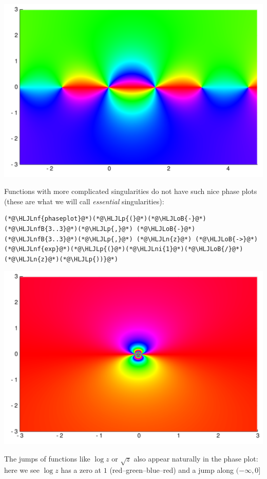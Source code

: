 \documentclass[12pt,a4paper]{article}
\newcommand{\HLJLn}[1]{#1}
\newcommand{\HLJLnf}[1]{\textcolor[RGB]{66,102,213}{#1}}
\newcommand{\HLJLnfB}[1]{\textcolor[RGB]{59,151,46}{#1}}
\newcommand{\HLJLni}[1]{\textcolor[RGB]{59,151,46}{#1}}
\newcommand{\HLJLoB}[1]{\textcolor[RGB]{102,102,102}{\textbf{#1}}}
\newcommand{\HLJLp}[1]{#1}
\def\endash{–}
\begin{document}
\includegraphics[width=\linewidth]{figures/Lecture1_10_1.pdf}

Functions with more complicated singularities do not have such nice phase plots (these are what we will call \emph{essential} singularities):


\begin{lstlisting}
(*@\HLJLnf{phaseplot}@*)(*@\HLJLp{(}@*)(*@\HLJLoB{-}@*)(*@\HLJLnfB{3..3}@*)(*@\HLJLp{,}@*) (*@\HLJLoB{-}@*)(*@\HLJLnfB{3..3}@*)(*@\HLJLp{,}@*) (*@\HLJLn{z}@*) (*@\HLJLoB{->}@*) (*@\HLJLnf{exp}@*)(*@\HLJLp{(}@*)(*@\HLJLni{1}@*)(*@\HLJLoB{/}@*)(*@\HLJLn{z}@*)(*@\HLJLp{))}@*)
\end{lstlisting}

\includegraphics[width=\linewidth]{figures/Lecture1_11_1.pdf}

The jumps of functions like $\log z$ or $\sqrt z$ also appear naturally in the phase plot: here we see $\log z$ has a zero at $1$ (red\ensuremath{\endash}green\ensuremath{\endash}blue\ensuremath{\endash}red) and a jump along $(-\infty,0]$
\end{document}

